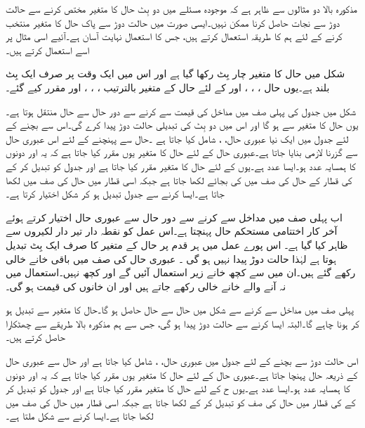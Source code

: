 مذکورہ بالا دو مثالوں سے ظاہر ہے کہ موجودہ مسئلے میں دو بِٹ حال کا متغیر مختص کرنے سے حالت دوڑ سے نجات حاصل کرنا ممکن نہیں۔ایسی صورت میں حالت دوڑ سے پاک حال کا متغیر منتخب کرنے کے لئے ہم  کا طریقہ استعمال کرتے ہیں، جس کا استعمال نہایت آسان ہے۔آئیے اسی مثال پر اسے استعمال کرتے ہیں۔

شکل میں حال کا متغیر چار بِٹ رکھا گیا ہے اور اس میں ایک وقت پر صرف ایک بِٹ بلند ہے۔یوں حال  ، ، ، اور  کے لئے حال کے متغیر بالترتیب ، ، ، اور  مقرر کیے گئے۔


شکل  میں جدول کی پہلی صف میں مداخل کی قیمت  سے  کرنے سے دور حال  سے حال  منتقل ہوتا ہے۔یوں حال کا متغیر  سے  ہو گا اور اس میں دو بِٹ کی تبدیلی حالت دوڑ پیدا کرے گی۔اس سے بچنے کے لئے جدول میں ایک نیا عبوری حال، ، شامل کیا جاتا ہے ۔حال  سے  پہنچنے کے لئے اس عبوری حال سے گزرنا لازمی بنایا جاتا ہے۔عبوری حال  کے لئے حال کا متغیر یوں مقرر کیا جاتا ہے کہ یہ  اور دونوں کا ہمسایہ عدد ہو۔ایسا عدد  ہے۔یوں  کے لئے حال کا متغیر  مقرر کیا جاتا ہے اور جدول کو تبدیل کر کے کی قطار کے حال  کی صف میں  کی بجائے  لکھا جاتا ہے جبکہ اسی قطار میں حال  کی صف میں  لکھا جاتا ہے۔ایسا کرنے سے جدول تبدیل ہو کر شکل  اختیار کرتا ہے۔


اب پہلی صف میں مداخل  سے  کرنے سے دور حال  سے عبوری حال  اختیار کرتے ہوئے آخر کار اختتامی مستحکم حال  پہنچتا ہے۔اس عمل کو نقطہ دار تیر دار لکیروں سے ظاہر کیا گیا ہے۔ اس پورے عمل میں ہر قدم پر حال کے متغیر کا صرف ایک بِٹ تبدیل ہوتا ہے لہٰذا حالت دوڑ پیدا نہیں ہو گی ۔ عبوری حال  کی صف میں باقی خانے خالی رکھے گئے ہیں۔ان میں سے کچھ خانے زیر استعمال آئیں گے اور کچھ نہیں۔استعمال میں نہ آنے والے خانے خالی رکھے جاتے ہیں اور ان خانوں کی قیمت ہو گی۔

پہلی صف میں مداخل سے  کرنے سے شکل  میں حال  سے حال حاصل ہو گا۔حال کا متغیر  سے تبدیل ہو کر  ہونا چاہے گا۔البتہ ایسا کرنے سے حالت دوڑ پیدا ہو گی، جس سے ہم مذکورہ بالا طریقے سے چھٹکارا حاصل کرتے ہیں۔

اس حالت دوڑ سے بچنے کے لئے جدول میں عبوری حال،  ، شامل کیا جاتا ہے اور حال  سے عبوری حال  کے ذریعہ حال  پہنچا جاتا ہے۔عبوری حال  کے لئے حال کا متغیر یوں مقرر کیا جاتا ہے کہ یہ  اور  دونوں کا ہمسایہ عدد ہو۔ایسا عدد  ہے۔یوں ح  کے لئے حال کا متغیر  مقرر کیا جاتا ہے اور جدول کو تبدیل کر کے  کی قطار میں حال  کی صف  کو تبدیل کر کے  لکھا جاتا ہے جبکہ اسی قطار میں حال  کی صف میں  لکھا جاتا ہے۔ایسا کرنے سے شکل  ملتا ہے۔

